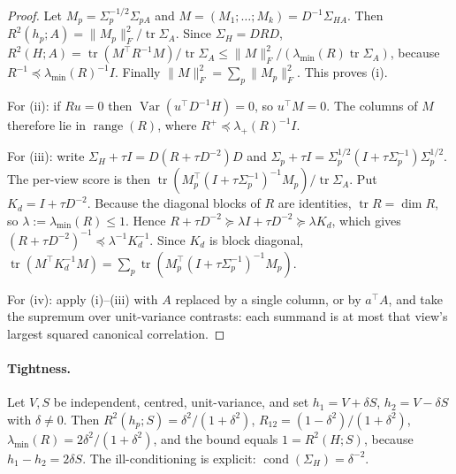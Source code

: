 \documentclass{article}
\DeclareMathOperator{\tr}{tr}
\begin{document}
\begin{proof}
Let $M_p=\Sigma_p^{-1/2}\Sigma_{pA}$ and $M=(M_1;\dots;M_k)=D^{-1}\Sigma_{HA}$. Then
$R^2(h_p;A)=\|M_p\|_F^2/\tr\Sigma_A$. Since $\Sigma_H=DRD$,
$R^2(H;A)=\tr(M^\top R^{-1}M)/\tr\Sigma_A\le \|M\|_F^2/(\lambda_{\min}(R)\tr\Sigma_A)$, because
$R^{-1}\preceq\lambda_{\min}(R)^{-1}I$. Finally $\|M\|_F^2=\sum_p\|M_p\|_F^2$. This proves (i).

For (ii): if $Ru=0$ then $\operatorname{Var}(u^\top D^{-1}H)=0$, so $u^\top M=0$. The columns of $M$ therefore
lie in $\operatorname{range}(R)$, where $R^{+}\preceq\lambda_+(R)^{-1}I$.

For (iii): write $\Sigma_H+\tau I=D(R+\tau D^{-2})D$ and $\Sigma_p+\tau I=\Sigma_p^{1/2}(I+\tau\Sigma_p^{-1})\Sigma_p^{1/2}$.
The per-view score is then $\tr(M_p^\top(I+\tau\Sigma_p^{-1})^{-1}M_p)/\tr\Sigma_A$. Put
$K_d=I+\tau D^{-2}$. Because the diagonal blocks of $R$ are identities, $\tr R=\dim R$, so
$\lambda:=\lambda_{\min}(R)\le1$. Hence $R+\tau D^{-2}\succeq\lambda I+\tau D^{-2}\succeq\lambda K_d$, which gives
$(R+\tau D^{-2})^{-1}\preceq\lambda^{-1}K_d^{-1}$. Since $K_d$ is block diagonal,
$\tr(M^\top K_d^{-1}M)=\sum_p\tr(M_p^\top(I+\tau\Sigma_p^{-1})^{-1}M_p)$.

For (iv): apply (i)--(iii) with $A$ replaced by a single column, or by $a^\top A$, and take the supremum
over unit-variance contrasts: each summand is at most that view's largest squared canonical correlation.
\end{proof}

\paragraph{Tightness.} Let $V,S$ be independent, centred, unit-variance, and set $h_1=V+\delta S$,
$h_2=V-\delta S$ with $\delta\ne0$. Then $R^2(h_p;S)=\delta^2/(1+\delta^2)$, $R_{12}=(1-\delta^2)/(1+\delta^2)$,
$\lambda_{\min}(R)=2\delta^2/(1+\delta^2)$, and the bound equals $1=R^2(H;S)$, because $h_1-h_2=2\delta S$. The
ill-conditioning is explicit: $\operatorname{cond}(\Sigma_H)=\delta^{-2}$.
\end{document}
